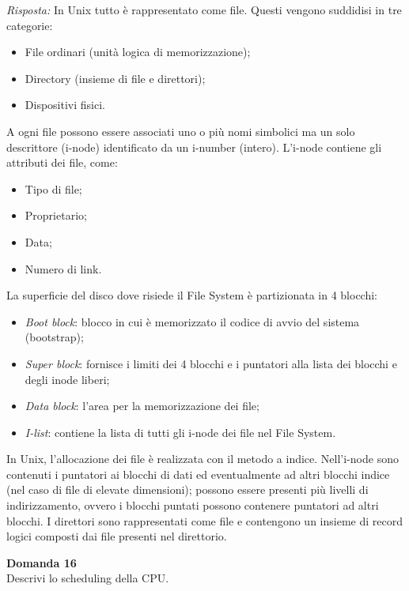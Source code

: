 \documentclass{article}
\newenvironment{problem}[2][Domanda]
    { \begin{mdframed}[backgroundcolor=gray!20] \textbf{#1 #2} \\}
    {  \end{mdframed}}
\newenvironment{solution}
    {\textit{Risposta:}}
    {}
\begin{document}
\begin{solution}
In Unix tutto è rappresentato come file.
\newline
Questi vengono suddidisi in tre categorie: 
\begin{itemize}
    \item File ordinari (unità logica di memorizzazione);
    \item Directory (insieme di file e direttori);
    \item Dispositivi fisici.
\end{itemize}
A ogni file possono essere associati uno o più nomi simbolici ma un solo descrittore (i-node) identificato da un i-number (intero).
\newline
L’i-node contiene gli attributi dei file, come:
\begin{itemize}
    \item Tipo di file;
    \item Proprietario;
    \item Data;
    \item Numero di link.
\end{itemize}
La superficie del disco dove risiede il File System è partizionata in 4 blocchi:
\begin{itemize}
    \item \emph{Boot block}: blocco in cui è memorizzato il codice di avvio del sistema (bootstrap);
    \item \emph{Super block}: fornisce i limiti dei 4 blocchi e i puntatori alla lista dei blocchi e degli inode liberi;
    \item \emph{Data block}: l’area per la memorizzazione dei file;
    \item \emph{I-list}: contiene la lista di tutti gli i-node dei file nel File System. 
\end{itemize}
In Unix, l’allocazione dei file è realizzata con il metodo a indice.
\newline
Nell’i-node sono contenuti i puntatori ai blocchi di dati ed eventualmente ad altri blocchi indice (nel caso di file di elevate dimensioni); possono essere presenti più livelli di indirizzamento, ovvero i blocchi puntati possono contenere puntatori ad altri blocchi.
\newline
I direttori sono rappresentati come file e contengono un insieme di record logici composti dai file presenti nel direttorio.
\end{solution}
\begin{problem}{16}
Descrivi lo scheduling della CPU.
\end{problem}
\end{document}
